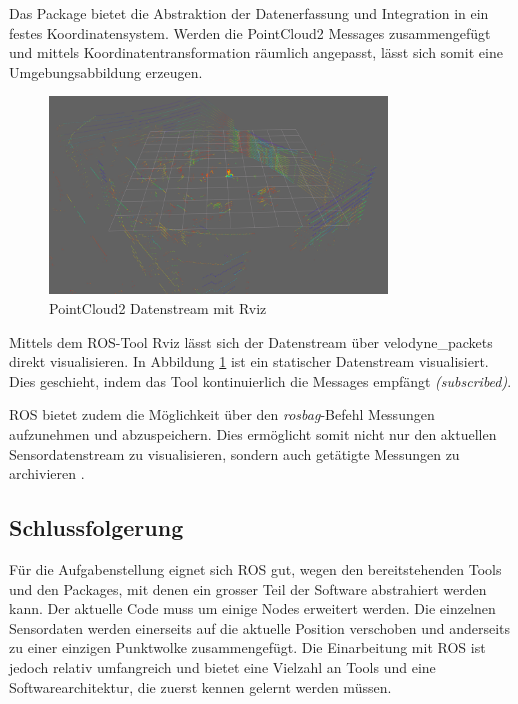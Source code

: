 Das Package bietet die Abstraktion der Datenerfassung und Integration in ein festes Koordinatensystem. Werden die PointCloud2 Messages zusammengefügt und mittels Koordinatentransformation räumlich angepasst, lässt sich somit eine Umgebungsabbildung erzeugen.
\begin{figure}[H]
	\centering
	\includegraphics[width=0.8\textwidth]{resources/rviz.PNG}
	\caption[PointCloud2 Datenstream mit Rviz]{PointCloud2 Datenstream mit Rviz}
	\label{fig:rviz}
\end{figure} 

Mittels dem ROS-Tool Rviz lässt sich der Datenstream über velodyne\_packets direkt visualisieren. In Abbildung \ref{fig:rviz} ist ein statischer Datenstream visualisiert. Dies geschieht, indem das Tool kontinuierlich die Messages empfängt \textit{(subscribed)}.

ROS bietet zudem die Möglichkeit über den \textit{rosbag}-Befehl Messungen aufzunehmen und abzuspeichern. Dies ermöglicht somit nicht nur den aktuellen Sensordatenstream zu visualisieren, sondern auch getätigte Messungen zu archivieren \cite{ROSTutorials}. 

\subsection{Schlussfolgerung}
Für die Aufgabenstellung eignet sich ROS gut, wegen den bereitstehenden Tools und den Packages, mit denen ein grosser Teil der Software abstrahiert werden kann. Der aktuelle Code muss um einige Nodes erweitert werden. Die einzelnen Sensordaten werden einerseits auf die aktuelle Position verschoben und anderseits zu einer einzigen Punktwolke zusammengefügt. Die Einarbeitung mit ROS ist jedoch relativ umfangreich und bietet eine Vielzahl an Tools und eine Softwarearchitektur, die zuerst kennen gelernt werden müssen.  

